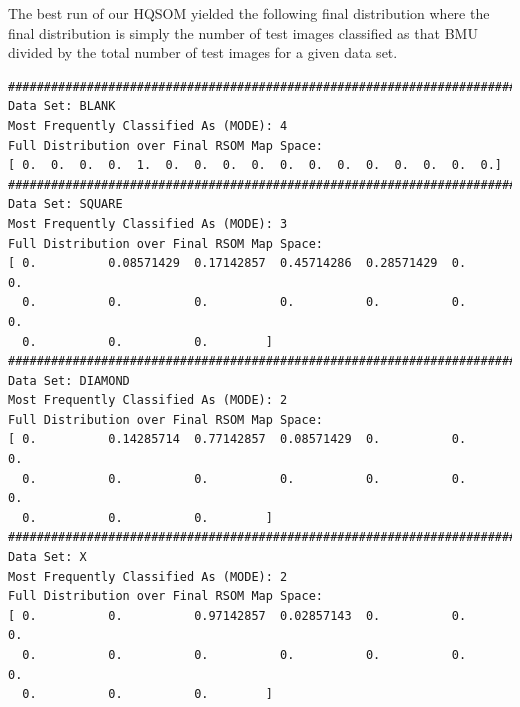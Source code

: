 \documentclass[a4paper,10pt]{article}
\begin{document}
The best
run of our HQSOM yielded the following final distribution where the final distribution is simply the
number of test images classified as that BMU divided by the total number of test images for a given
data set.

\begin{center}
\small
\begin{verbatim}
################################################################################
Data Set: BLANK
Most Frequently Classified As (MODE): 4
Full Distribution over Final RSOM Map Space:
[ 0.  0.  0.  0.  1.  0.  0.  0.  0.  0.  0.  0.  0.  0.  0.  0.  0.]
################################################################################
Data Set: SQUARE
Most Frequently Classified As (MODE): 3
Full Distribution over Final RSOM Map Space:
[ 0.          0.08571429  0.17142857  0.45714286  0.28571429  0.          0.
  0.          0.          0.          0.          0.          0.          0.
  0.          0.          0.        ]
################################################################################
Data Set: DIAMOND
Most Frequently Classified As (MODE): 2
Full Distribution over Final RSOM Map Space:
[ 0.          0.14285714  0.77142857  0.08571429  0.          0.          0.
  0.          0.          0.          0.          0.          0.          0.
  0.          0.          0.        ]
################################################################################
Data Set: X
Most Frequently Classified As (MODE): 2
Full Distribution over Final RSOM Map Space:
[ 0.          0.          0.97142857  0.02857143  0.          0.          0.
  0.          0.          0.          0.          0.          0.          0.
  0.          0.          0.        ]

\end{verbatim} 
\end{center}
\end{document}

